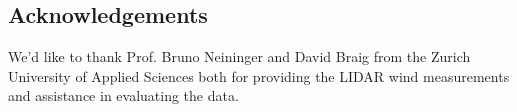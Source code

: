 \documentclass[twocolumn,letterpaper]{IEEEAerospaceCLS}
\begin{document}

\subsection*{Acknowledgements}
We'd like to thank Prof. Bruno Neininger and  David Braig from the Zurich University of Applied Sciences both for providing the LIDAR wind measurements and assistance in evaluating the data.




\end{document}
